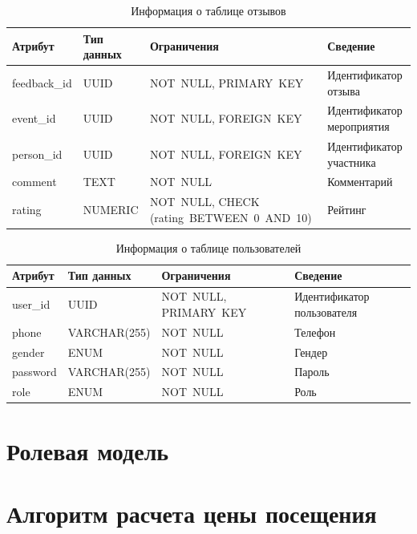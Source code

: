 \begin{table}[h]
	\centering
	\caption{Информация о таблице отзывов}
	\begin{tabularx}{\textwidth}{|p{2.6cm}|X|p{6cm}|X|}
		\hline
		\textbf{Атрибут} & \textbf{Тип данных} & \textbf{Ограничения} & \textbf{Сведение} \\
		\hline
		feedback\_id & UUID & NOT~NULL, \newline PRIMARY~KEY & Идентификатор отзыва \\
		\hline
		event\_id & UUID & NOT~NULL, \newline FOREIGN~KEY & Идентификатор мероприятия \\
		\hline
		person\_id & UUID & NOT~NULL, \newline FOREIGN~KEY & Идентификатор участника \\
		\hline
		comment & TEXT & NOT~NULL & Комментарий \\
		\hline
		rating & NUMERIC & NOT~NULL, \newline CHECK (rating~BETWEEN~0~AND~10) & Рейтинг \\
		\hline
	\end{tabularx}
	\label{tbl:feedbacks}
\end{table}

\begin{table}[h]
	\centering
	\caption{Информация о таблице пользователей}
	\begin{tabularx}{\textwidth}{|p{2.6cm}|X|p{6cm}|X|}
		\hline
		\textbf{Атрибут} & \textbf{Тип данных} & \textbf{Ограничения} & \textbf{Сведение} \\
		\hline
		user\_id & UUID & NOT~NULL, \newline PRIMARY~KEY & Идентификатор пользователя \\
		\hline
		phone & VARCHAR(255) & NOT~NULL & Телефон \\
		\hline
		gender & ENUM & NOT~NULL & Гендер \\
		\hline
		password & VARCHAR(255) & NOT~NULL & Пароль \\
		\hline
		role & ENUM & NOT~NULL & Роль \\
		\hline
	\end{tabularx}
	\label{tbl:users}
\end{table}

\section{Ролевая модель}

\section{Алгоритм расчета цены посещения}

